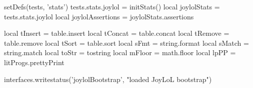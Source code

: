                          setDefs(tests, 'stats')
tests.stats.joylol     = initStats()
local joylolStats      = tests.stats.joylol
local joylolAssertions = joylolStats.assertions

local tInsert = table.insert
local tConcat = table.concat
local tRemove = table.remove
local tSort   = table.sort
local sFmt    = string.format
local sMatch  = string.match
local toStr   = tostring
local mFloor  = math.floor
local lpPP    = litProgs.prettyPrint

interfaces.writestatus('joylolBootstrap', "loaded JoyLoL bootstrap")
\stopLuaCode

